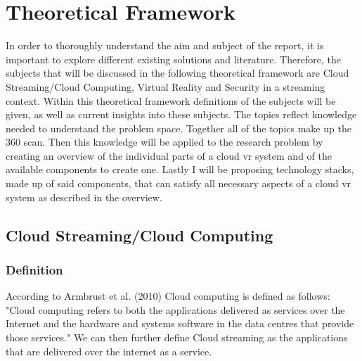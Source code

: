 \section{Theoretical Framework}
In order to thoroughly understand the aim and subject of the report, it is important to explore different existing solutions and literature. Therefore, the subjects that will be discussed in the following theoretical framework are Cloud Streaming/Cloud Computing, Virtual Reality and Security in a streaming context. Within this theoretical framework definitions of the subjects will be given, as well as current insights into these subjects. The topics reflect knowledge needed to understand the problem space. Together all of the topics make up the 360 scan. Then this knowledge will be applied to the research problem by creating an overview of the individual parts of a cloud \acrshort{vr} system and of the available components to create one.  Lastly I will be proposing technology stacks, made up of said components, that can satisfy all necessary aspects of a cloud \acrshort{vr} system as described in the overview.

\subsection{Cloud Streaming/Cloud Computing}

\subsubsection{Definition}
According to Armbrust et al. (2010) Cloud computing is defined as follows: 
"Cloud computing refers to both the applications delivered as services over the Internet and the hardware and systems software in the data centres that provide those services." \parencite{aviewoncc}
We can then further define Cloud streaming as the applications that are delivered over the internet as a service.

